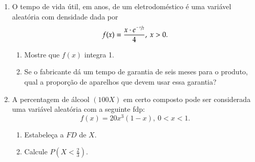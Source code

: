 \begin{enumerate}
\begin{enumerate}[label=\alph*)]
	\end{enumerate}
	
\item O tempo de vida útil, em anos, de um eletrodoméstico é uma variável aleatória com densidade dada por
	\begin{equation*}
		f(x)=\dfrac{x\cdot e^{\sfrac{-x}{2}}}{4},\ x>0.
	\end{equation*}
	
	\begin{enumerate}[label=\alph*)]
		\item Mostre que $f(x)$ integra 1.
		
		\item Se o fabricante dá um tempo de garantia de seis meses para o produto, qual a proporção de aparelhos que devem usar essa garantia?
		
		
	\end{enumerate}
	
\setcounter{enumi}{3}
\item A percentagem de álcool $(100X)$ em certo composto pode ser considerada uma variável aleatória com a seguinte fdp:
	\begin{equation*}
		f(x) = 20x^{3}(1-x),\ 0 < x < 1.
	\end{equation*}

	\begin{enumerate}[label=\alph*)]
		\item Estabeleça a $FD$ de $X$.
		
		\item Calcule $P\left(X < \frac{2}{3}\right)$.
		

\end{enumerate}
\end{enumerate}
